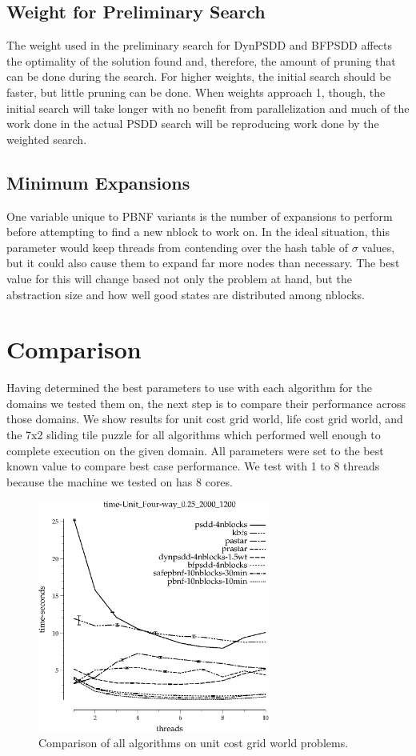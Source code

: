 \documentclass{article}
\begin{document}
\subsection{Weight for Preliminary Search}
The weight used in the preliminary search for DynPSDD and BFPSDD affects the optimality of the solution found and, therefore, the amount of pruning that can be done during the search. For higher weights, the initial search should be faster, but little pruning can be done. When weights approach 1, though, the initial search will take longer with no benefit from parallelization and much of the work done in the actual PSDD search will be reproducing work done by the weighted search.
\subsection{Minimum Expansions}
One variable unique to PBNF variants is the number of expansions to perform before attempting to find a new nblock to work on. In the ideal situation, this parameter would keep threads from contending over the hash table of $\sigma$ values, but it could also cause them to expand far more nodes than necessary. The best value for this will change based not only the problem at hand, but the abstraction size and how well good states are distributed among nblocks.
\section{Comparison}
Having determined the best parameters to use with each algorithm for the domains we tested them on, the next step is to compare their performance across those domains. We show results for unit cost grid world, life cost grid world, and the 7x2 sliding tile puzzle for all algorithms which performed well enough to complete execution on the given domain. All parameters were set to the best known value to compare best case performance. We test with 1 to 8 threads because the machine we tested on has 8 cores.

\begin{figure}[h!]
\includegraphics[width=3in]{../graphs/seth/time-Unit_Four-way_0.25_2000_1200.eps}
\caption{Comparison of all algorithms on unit cost grid world problems.}
\label{fig:comp-grid}
\end{figure}
\end{document}
